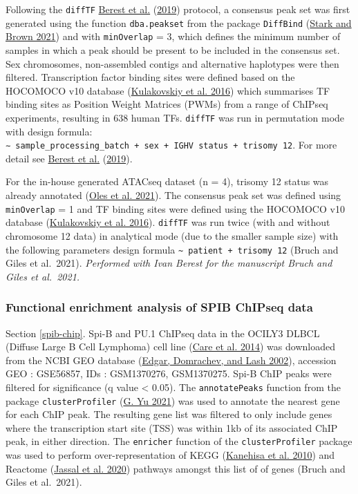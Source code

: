 \documentclass[11pt, a4paper, twosided]{book}
\begin{document}
Following the \texttt{diffTF} \protect\hyperlink{ref-Berest2019}{Berest et al.} (\protect\hyperlink{ref-Berest2019}{2019}) protocol, a consensus peak set was first generated using the function \texttt{dba.peakset} from the package \texttt{DiffBind} (\protect\hyperlink{ref-R-DiffBind}{Stark and Brown 2021}) and with \texttt{minOverlap} = 3, which defines the minimum number of samples in which a peak should be present to be included in the consensus set. Sex chromosomes, non-assembled contigs and alternative haplotypes were then filtered. Transcription factor binding sites were defined based on the HOCOMOCO v10 database (\protect\hyperlink{ref-HOCOMOCO}{Kulakovskiy et al. 2016}) which summarises TF binding sites as Position Weight Matrices (PWMs) from a range of ChIPseq experiments, resulting in 638 human TFs. \texttt{diffTF} was run in permutation mode with design formula: \texttt{∼\ sample\_processing\_batch\ +\ sex\ +\ IGHV\ status\ +\ trisomy\ 12}. For more detail see \protect\hyperlink{ref-Berest2019}{Berest et al.} (\protect\hyperlink{ref-Berest2019}{2019}).

For the in-house generated ATACseq dataset (n = 4), trisomy 12 status was already annotated (\protect\hyperlink{ref-R-BloodCancerMultiOmics2017}{Oles et al. 2021}). The consensus peak set was defined using \texttt{minOverlap} = 1 and TF binding sites were defined using the HOCOMOCO v10 database (\protect\hyperlink{ref-HOCOMOCO}{Kulakovskiy et al. 2016}). \texttt{diffTF} was run twice (with and without chromosome 12 data) in analytical mode (due to the smaller sample size) with the following parameters design formula \texttt{\textasciitilde{}\ patient\ +\ trisomy\ 12} (Bruch and Giles et al.~2021). \emph{Performed with Ivan Berest for the manuscript Bruch and Giles et al.~2021.}

\hypertarget{functional-enrichment-analysis-of-spib-chipseq-data}{%
\subsubsection{Functional enrichment analysis of SPIB ChIPseq data}\label{functional-enrichment-analysis-of-spib-chipseq-data}}

Section \ref{spib-chip}. Spi-B and PU.1 ChIPseq data in the OCILY3 DLBCL (Diffuse Large B Cell Lymphoma) cell line (\protect\hyperlink{ref-Care2014}{Care et al. 2014}) was downloaded from the NCBI GEO database (\protect\hyperlink{ref-Edgar2002}{Edgar, Domrachev, and Lash 2002}), accession GEO : GSE56857, IDs : GSM1370276, GSM1370275. Spi-B ChIP peaks were filtered for significance (q value \textless{} 0.05). The \texttt{annotatePeaks} function from the package \texttt{clusterProfiler} (\protect\hyperlink{ref-R-clusterProfiler}{G. Yu 2021}) was used to annotate the nearest gene for each ChIP peak. The resulting gene list was filtered to only include genes where the transcription start site (TSS) was within 1kb of its associated ChIP peak, in either direction. The \texttt{enricher} function of the \texttt{clusterProfiler} package was used to perform over-representation of KEGG (\protect\hyperlink{ref-KEGG}{Kanehisa et al. 2010}) and Reactome (\protect\hyperlink{ref-Reactome}{Jassal et al. 2020}) pathways amongst this list of of genes (Bruch and Giles et al.~2021).
\end{document}
